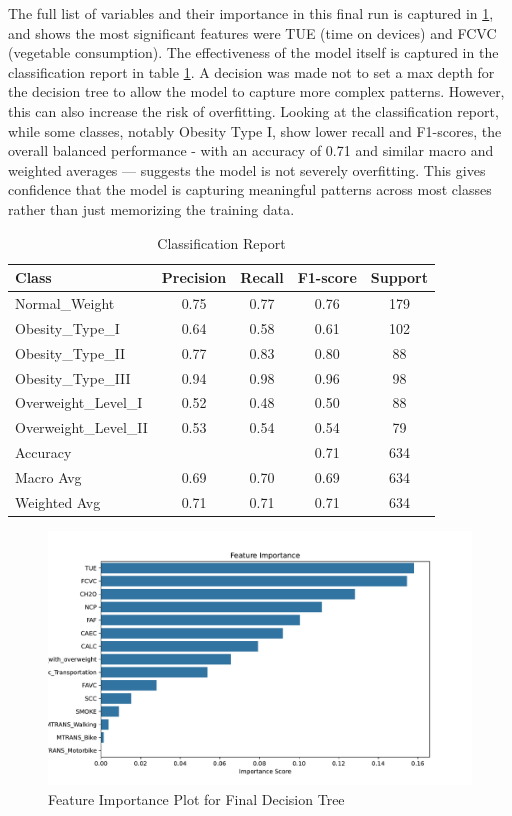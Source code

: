 The full list of variables and their importance in this final run is captured in \ref{fig:feature_importance}, and shows the most significant features were TUE (time on devices) and FCVC (vegetable consumption). The effectiveness of the model itself is captured in the classification report in table \ref{tab:classification_report}. A decision was made not to set a max depth for the decision tree to allow the model to capture more complex patterns. However, this can also increase the risk of overfitting. Looking at the classification report, while some classes, notably Obesity Type I, show lower recall and F1-scores, the overall balanced performance - with an accuracy of 0.71 and similar macro and weighted averages — suggests the model is not severely overfitting. This gives confidence that the model is capturing meaningful patterns across most classes rather than just memorizing the training data. 

\begin{table}[h]
\centering
\begin{tabular}{lcccc}
\toprule
\textbf{Class} & \textbf{Precision} & \textbf{Recall} & \textbf{F1-score} & \textbf{Support} \\
\midrule
Normal\_Weight      & 0.75 & 0.77 & 0.76 & 179 \\
Obesity\_Type\_I     & 0.64 & 0.58 & 0.61 & 102 \\
Obesity\_Type\_II    & 0.77 & 0.83 & 0.80 & 88  \\
Obesity\_Type\_III   & 0.94 & 0.98 & 0.96 & 98  \\
Overweight\_Level\_I & 0.52 & 0.48 & 0.50 & 88  \\
Overweight\_Level\_II& 0.53 & 0.54 & 0.54 & 79  \\
\midrule
Accuracy            &      &      & 0.71 & 634 \\
Macro Avg           & 0.69 & 0.70 & 0.69 & 634 \\
Weighted Avg        & 0.71 & 0.71 & 0.71 & 634 \\
\bottomrule
\end{tabular}
\caption{Classification Report}
\label{tab:classification_report}
\end{table}

\begin{figure}[h]
    \centering
    \includegraphics[width=1\textwidth]{feature_importance.pdf}
    \caption{Feature Importance Plot for Final Decision Tree}
    \label{fig:feature_importance}
\end{figure}


